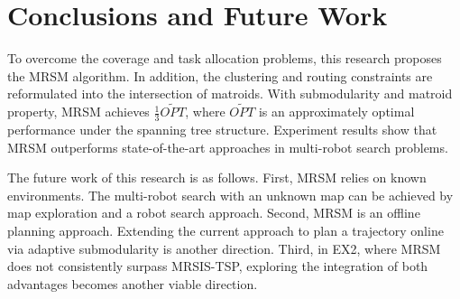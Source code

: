 \chapter{Conclusions and Future Work}
To overcome the coverage and task allocation problems, this research proposes the MRSM algorithm.
In addition, the clustering and routing constraints are reformulated into the intersection of matroids.
With submodularity and matroid property, MRSM achieves $\frac{1}{3}\widetilde{OPT}$, where $\widetilde{OPT}$ is an approximately optimal performance under the spanning tree structure.
Experiment results show that MRSM outperforms state-of-the-art approaches in multi-robot search problems.

The future work of this research is as follows.
First, MRSM relies on known environments. The multi-robot search with an unknown map can be achieved by map exploration and a robot search approach.\cite{Lu2020map}
Second, MRSM is an offline planning approach. Extending the current approach to plan a trajectory online via adaptive submodularity is another direction.\cite{golovin2011adaptive}
Third, in EX2, where MRSM does not consistently surpass MRSIS-TSP\cite{li2024mrsis}, exploring the integration of both advantages becomes another viable direction.
